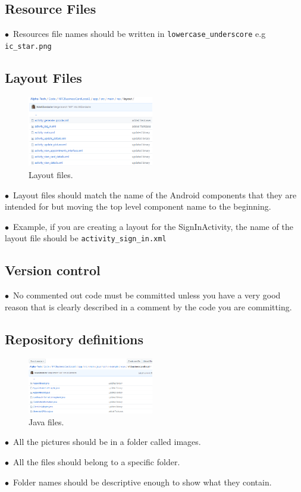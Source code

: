 \documentclass[english]{article}
\begin{document}
\subsection{Resource Files}
$\bullet$\ Resources file names should be written in  \texttt{lowercase\_underscore}  e.g  \texttt{ic\_star.png} \par


\subsection{Layout Files}
\begin{figure}
	\caption{Layout files.}
	\label{wrap-fig:5}
	\includegraphics[width=5.5cm]{images/layouts.png}
\end{figure} 
$\bullet$\ Layout files should match the name of the Android components that they are intended for but moving the top level component name to the beginning. \par
$\bullet$\ Example, if you are creating a layout for the SignInActivity, the name of the layout file should be \texttt{activity\_sign\_in.xml} \par



\subsection{Version control}
$\bullet$\ No commented out code must be committed unless you have a very good reason that is clearly described in a comment by the code you are committing. \par


\subsection{Repository definitions}
\begin{figure}
	\caption{Java files.}
	\label{wrap-fig:6}
	\includegraphics[width=5.5cm]{images/javafiles.png}
\end{figure} 
$\bullet$\ All the pictures should be in a folder called images. \par
$\bullet$\ All the files should belong to a specific folder. \par
$\bullet$\ Folder names should be descriptive enough to show what they contain. \par
\end{document}
